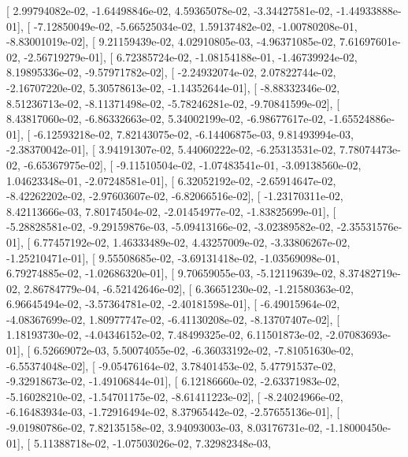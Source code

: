 \documentclass{article}
\begin{document}
       [  2.99794082e-02,  -1.64498846e-02,   4.59365078e-02,
         -3.34427581e-02,  -1.44933888e-01],
       [ -7.12850049e-02,  -5.66525034e-02,   1.59137482e-02,
         -1.00780208e-01,  -8.83001019e-02],
       [  9.21159439e-02,   4.02910805e-03,  -4.96371085e-02,
          7.61697601e-02,  -2.56719279e-01],
       [  6.72385724e-02,  -1.08154188e-01,  -1.46739924e-02,
          8.19895336e-02,  -9.57971782e-02],
       [ -2.24932074e-02,   2.07822744e-02,  -2.16707220e-02,
          5.30578613e-02,  -1.14352644e-01],
       [ -8.88332346e-02,   8.51236713e-02,  -8.11371498e-02,
         -5.78246281e-02,  -9.70841599e-02],
       [  8.43817060e-02,  -6.86332663e-02,   5.34002199e-02,
         -6.98677617e-02,  -1.65524886e-01],
       [ -6.12593218e-02,   7.82143075e-02,  -6.14406875e-03,
          9.81493994e-03,  -2.38370042e-01],
       [  3.94191307e-02,   5.44060222e-02,  -6.25313531e-02,
          7.78074473e-02,  -6.65367975e-02],
       [ -9.11510504e-02,  -1.07483541e-01,  -3.09138560e-02,
          1.04623348e-01,  -2.07248581e-01],
       [  6.32052192e-02,  -2.65914647e-02,  -8.42262202e-02,
         -2.97603607e-02,  -6.82066516e-02],
       [ -1.23170311e-02,   8.42113666e-03,   7.80174504e-02,
         -2.01454977e-02,  -1.83825699e-01],
       [ -5.28828581e-02,  -9.29159876e-03,  -5.09413166e-02,
         -3.02389582e-02,  -2.35531576e-01],
       [  6.77457192e-02,   1.46333489e-02,   4.43257009e-02,
         -3.33806267e-02,  -1.25210471e-01],
       [  9.55508685e-02,  -3.69131418e-02,  -1.03569098e-01,
          6.79274885e-02,  -1.02686320e-01],
       [  9.70659055e-03,  -5.12119639e-02,   8.37482719e-02,
          2.86784779e-04,  -6.52142646e-02],
       [  6.36651230e-02,  -1.21580363e-02,   6.96645494e-02,
         -3.57364781e-02,  -2.40181598e-01],
       [ -6.49015964e-02,  -4.08367699e-02,   1.80977747e-02,
         -6.41130208e-02,  -8.13707407e-02],
       [  1.18193730e-02,  -4.04346152e-02,   7.48499325e-02,
          6.11501873e-02,  -2.07083693e-01],
       [  6.52669072e-03,   5.50074055e-02,  -6.36033192e-02,
         -7.81051630e-02,  -6.55374048e-02],
       [ -9.05476164e-02,   3.78401453e-02,   5.47791537e-02,
         -9.32918673e-02,  -1.49106844e-01],
       [  6.12186660e-02,  -2.63371983e-02,  -5.16028210e-02,
         -1.54701175e-02,  -8.61411223e-02],
       [ -8.24024966e-02,  -6.16483934e-03,  -1.72916494e-02,
          8.37965442e-02,  -2.57655136e-01],
       [ -9.01980786e-02,   7.82135158e-02,   3.94093003e-03,
          8.03176731e-02,  -1.18000450e-01],
       [  5.11388718e-02,  -1.07503026e-02,   7.32982348e-03,
\end{document}
